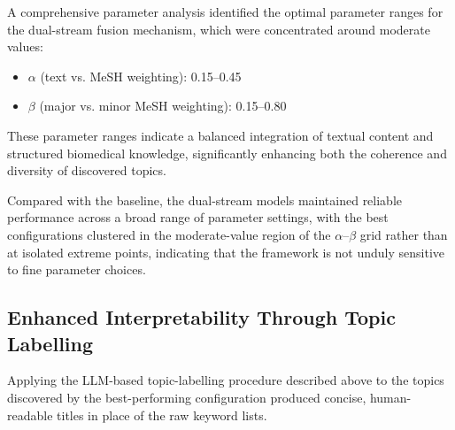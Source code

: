 \documentclass[authorproof,JACIII,researchpaper]{fujipressarticle}
\begin{document}
A comprehensive parameter analysis identified the optimal parameter ranges for the dual-stream fusion mechanism, which were concentrated around moderate values:

\begin{itemize}
    \item $\alpha$ (text vs. MeSH weighting): 0.15--0.45
    \item $\beta$ (major vs. minor MeSH weighting): 0.15--0.80
\end{itemize}

These parameter ranges indicate a balanced integration of textual content and structured biomedical knowledge, significantly enhancing both the coherence and diversity of discovered topics.

Compared with the baseline, the dual-stream models maintained reliable performance across a broad range of parameter settings, with the best configurations clustered in the moderate-value region of the $\alpha$--$\beta$ grid rather than at isolated extreme points, indicating that the framework is not unduly sensitive to fine parameter choices.

\subsection{Enhanced Interpretability Through Topic Labelling}

Applying the LLM-based topic-labelling procedure described above to the topics discovered by the best-performing configuration produced concise, human-readable titles in place of the raw keyword lists.
\end{document}
